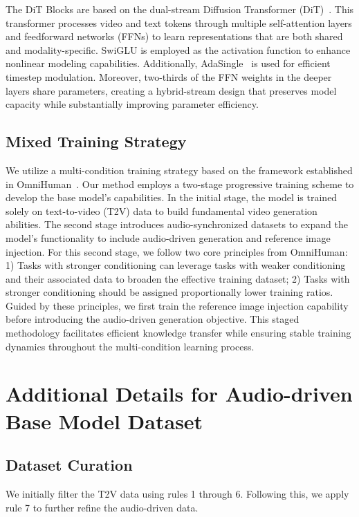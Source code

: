 \documentclass{article} %
\begin{document}
The DiT Blocks are based on the dual-stream Diffusion Transformer (DiT)~\citep{esser2024sd3}. This transformer processes video and text tokens through multiple self-attention layers and feedforward networks (FFNs) to learn representations that are both shared and modality-specific. SwiGLU is employed as the activation function to enhance nonlinear modeling capabilities. Additionally, AdaSingle~\citep{chen2023pixart} is used for efficient timestep modulation. Moreover, two-thirds of the FFN weights in the deeper layers share parameters, creating a hybrid-stream design that preserves model capacity while substantially improving parameter efficiency.

\subsection{Mixed Training Strategy}

We utilize a multi-condition training strategy based on the framework established in OmniHuman~\citep{lin2025omnihuman}. Our method employs a two-stage progressive training scheme to develop the base model's capabilities. In the initial stage, the model is trained solely on text-to-video (T2V) data to build fundamental video generation abilities. The second stage introduces audio-synchronized datasets to expand the model's functionality to include audio-driven generation and reference image injection. For this second stage, we follow two core principles from OmniHuman: 1) Tasks with stronger conditioning can leverage tasks with weaker conditioning and their associated data to broaden the effective training dataset; 2) Tasks with stronger conditioning should be assigned proportionally lower training ratios. Guided by these principles, we first train the reference image injection capability before introducing the audio-driven generation objective. This staged methodology facilitates efficient knowledge transfer while ensuring stable training dynamics throughout the multi-condition learning process.



\section{Additional Details for Audio-driven Base Model Dataset}

\subsection{Dataset Curation}
We initially filter the T2V data using rules 1 through 6. Following this, we apply rule 7 to further refine the audio-driven data.
\end{document}
